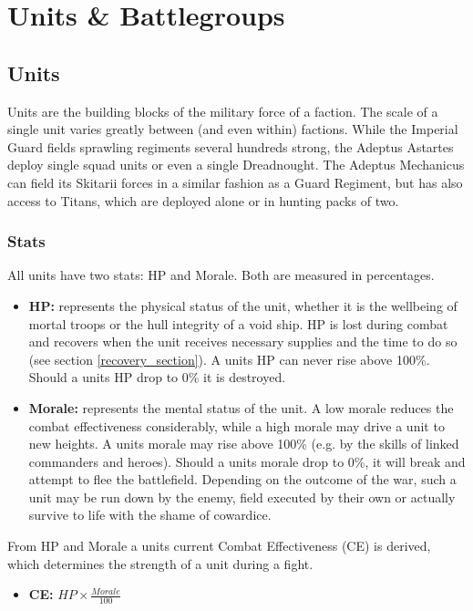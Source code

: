 \chapter{Units \& Battlegroups}
\section{Units}
Units are the building blocks of the military force of a faction. The scale of a single unit varies greatly between (and even within) factions. While the Imperial Guard fields sprawling regiments several hundreds strong, the Adeptus Astartes deploy single squad units or even a single Dreadnought. The Adeptus Mechanicus can field its Skitarii forces in a similar fashion as a Guard Regiment, but has also access to Titans, which are deployed alone or in hunting packs of two.

\subsection{Stats}
All units have two stats: HP and Morale. Both are measured in percentages.
\begin{itemize}
	\item \textbf{HP:} represents the physical status of the unit, whether it is the wellbeing of mortal troops or the hull integrity of a void ship. HP is lost during combat and recovers when the unit receives necessary supplies and the time to do so (see section \ref{recovery_section}). A units HP can never rise above 100\%. Should a units HP drop to 0\% it is destroyed.
	\item \textbf{Morale:} represents the mental status of the unit. A low morale reduces the combat effectiveness considerably, while a high morale may drive a unit to new heights. A units morale may rise above 100\% (e.g. by the skills of linked commanders and heroes). Should a units morale drop to 0\%, it will break and attempt to flee the battlefield. Depending on the outcome of the war, such a unit may be run down by the enemy, field executed by their own or actually survive to life with the shame of cowardice. 
\end{itemize}
From HP and Morale a units current Combat Effectiveness	(CE) is derived, which determines the strength of a unit during a fight.
\begin{itemize}
	\item \textbf{CE:} $HP \times \frac{Morale}{100}$
\end{itemize}


